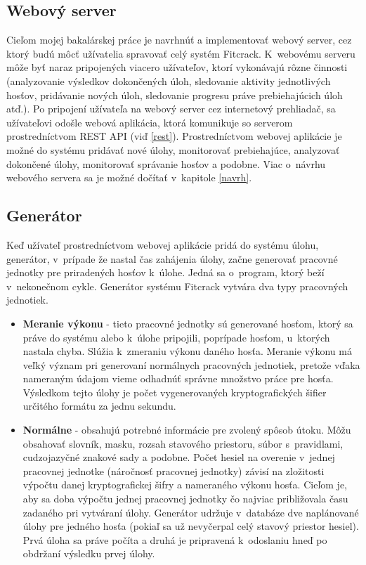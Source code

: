 \documentclass[slovak]{fitthesis}
\begin{document}
\subsection{Webový server}
Cieľom mojej bakalárskej práce je navrhnúť a implementovať webový server, cez ktorý budú môcť užívatelia spravovať celý systém Fitcrack. K~webovému serveru môže byť naraz pripojených viacero užívateľov, ktorí vykonávajú rôzne činnosti (analyzovanie výsledkov dokončených úloh, sledovanie aktivity jednotlivých hosťov, pridávanie nových úloh, sledovanie progresu práve prebiehajúcich úloh atď.). Po pripojení užívateľa na webový server cez internetový prehliadač, sa užívateľovi odošle webová aplikácia, ktorá komunikuje so serverom prostredníctvom REST API (viď \ref{rest}). Prostredníctvom webovej aplikácie je možné do systému pridávať nové úlohy, monitorovať prebiehajúce, analyzovať dokončené úlohy, monitorovať správanie hosťov a podobne. Viac o~návrhu webového servera sa je možné dočítať v~kapitole \ref{navrh}.

\subsection{Generátor}
Keď užívateľ prostredníctvom webovej aplikácie pridá do systému úlohu, generátor, v~prípade že nastal čas zahájenia úlohy, začne generovať pracovné jednotky pre priradených hosťov k~úlohe. Jedná sa o~program, ktorý beží v~nekonečnom cykle. Generátor systému Fitcrack vytvára dva typy pracovných jednotiek.
\begin{itemize}
    \item \textbf{Meranie výkonu} - tieto pracovné jednotky sú generované hosťom, ktorý sa práve do systému alebo k~úlohe pripojili, poprípade hosťom, u~ktorých nastala chyba. Slúžia k~zmeraniu výkonu daného hosťa. Meranie výkonu má veľký význam pri generovaní normálnych pracovných jednotiek, pretože vďaka nameraným údajom vieme odhadnúť správne množstvo práce pre hosťa. Výsledkom tejto úlohy je počet vygenerovaných kryptografických šifier určitého formátu za jednu sekundu. 
    \item \textbf{Normálne} - obsahujú potrebné informácie pre zvolený spôsob útoku. Môžu obsahovať slovník, masku, rozsah stavového priestoru, súbor s~pravidlami, cudzojazyčné znakové sady a podobne. Počet hesiel na overenie v~jednej pracovnej jednotke (náročnosť pracovnej jednotky) závisí na zložitosti výpočtu danej kryptografickej šifry a nameraného výkonu hosťa. Cieľom je, aby sa doba výpočtu jednej pracovnej jednotky čo najviac približovala času zadaného pri vytváraní úlohy. Generátor udržuje v~databáze dve naplánované úlohy pre jedného hosťa (pokiaľ sa už nevyčerpal celý stavový priestor hesiel). Prvá úloha sa práve počíta a druhá je pripravená k~odoslaniu hneď po obdržaní výsledku prvej úlohy.
\end{itemize}
\end{document}
